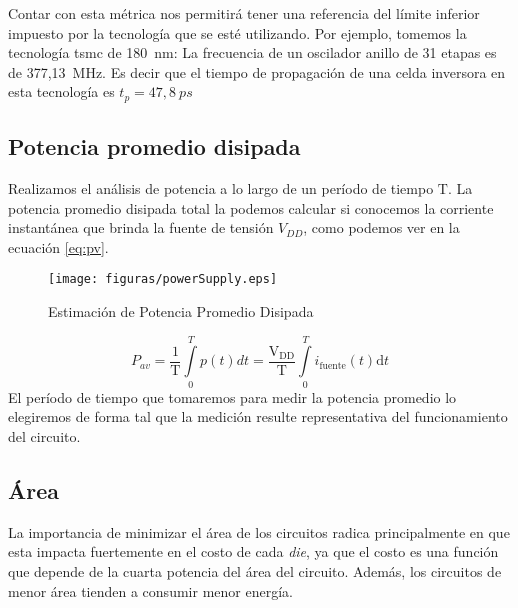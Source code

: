 Contar con esta métrica nos permitirá tener una referencia del límite inferior impuesto por la tecnología que se esté utilizando. Por ejemplo, tomemos la tecnología \gls{tsmc} de 180~nm: La frecuencia de un oscilador anillo de 31 etapas es de 377,13~MHz. Es decir que el tiempo de propagación de una celda inversora en esta tecnología es $t_p = 47,8~ps$












\subsection{Potencia promedio disipada}
Realizamos el análisis de potencia a lo largo de un período de tiempo $\mathrm{T}$. La potencia promedio disipada total la podemos calcular si conocemos la corriente instantánea que brinda la fuente de tensión $V_{DD}$, como podemos ver en la ecuación \ref{eq:pv}.
\begin{figure}[h]
\centering
\texttt{[image: figuras/powerSupply.eps]}
  \caption{Estimación de Potencia Promedio Disipada }
  \label{fig:powerSupply}
\end{figure}

\begin{equation}
P_{av} = \frac{1}{\mathrm{T}}\int\limits_0^T p(t)dt = \mathrm{\frac{V_{DD}}{T}}\int\limits_0^T i_{\mathrm{fuente}}(t)\mathrm{d}t 
\label{eq:pv}
\end{equation}
El período de tiempo que tomaremos para medir la potencia promedio lo elegiremos de forma tal que la medición resulte representativa del funcionamiento del circuito.

\subsection{Área}
La importancia de minimizar el área de los circuitos radica principalmente en que esta impacta fuertemente en el costo de cada \emph{die}\cite{HennessyPatterson}, ya que el costo es una función que depende de la cuarta potencia del área del circuito\cite{rabaey2003}. Además, los circuitos de menor área tienden a consumir menor energía. 



